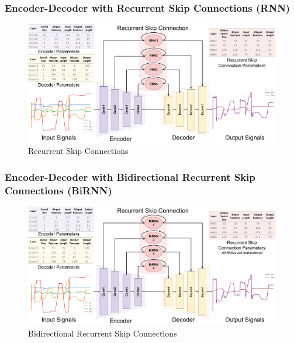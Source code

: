\documentclass{beamer}
\begin{document}
\begin{frame}
\frametitle{Encoder-Decoder with Recurrent Skip Connections (RNN)}

\begin{figure}[ht!]
    \centering
        \includegraphics[scale=0.19]{images/ed_st_rnn.pdf}
    \caption{Recurrent Skip Connections}
    \label{fig:random}
    \vspace{-1em}
\end{figure}

\end{frame}

\begin{frame}
\frametitle{Encoder-Decoder with Bidirectional Recurrent Skip Connections (BiRNN)}

\begin{figure}[ht!]
    \centering
        \includegraphics[scale=0.17]{images/ed_st_birnn.pdf}
    \caption{Bidirectional Recurrent Skip Connections}
    \label{fig:random}
    \vspace{-1em}
\end{figure}

\end{frame}
\end{document}
